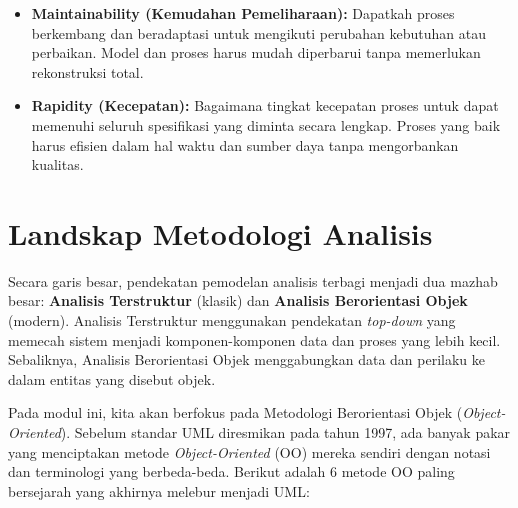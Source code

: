 \documentclass[12pt,a4paper]{article}
\begin{document}
\begin{itemize}
    \item \textbf{Maintainability (Kemudahan Pemeliharaan):} Dapatkah proses berkembang dan beradaptasi untuk mengikuti perubahan kebutuhan atau perbaikan. Model dan proses harus mudah diperbarui tanpa memerlukan rekonstruksi total.
    
    \item \textbf{Rapidity (Kecepatan):} Bagaimana tingkat kecepatan proses untuk dapat memenuhi seluruh spesifikasi yang diminta secara lengkap. Proses yang baik harus efisien dalam hal waktu dan sumber daya tanpa mengorbankan kualitas.
\end{itemize}

\newpage
\section{Landskap Metodologi Analisis}

Secara garis besar, pendekatan pemodelan analisis terbagi menjadi dua mazhab besar: \textbf{Analisis Terstruktur} (klasik) dan \textbf{Analisis Berorientasi Objek} (modern). Analisis Terstruktur menggunakan pendekatan \textit{top-down} yang memecah sistem menjadi komponen-komponen data dan proses yang lebih kecil. Sebaliknya, Analisis Berorientasi Objek menggabungkan data dan perilaku ke dalam entitas yang disebut objek.

Pada modul ini, kita akan berfokus pada Metodologi Berorientasi Objek (\textit{Object-Oriented}). Sebelum standar UML diresmikan pada tahun 1997, ada banyak pakar yang menciptakan metode \textit{Object-Oriented} (OO) mereka sendiri dengan notasi dan terminologi yang berbeda-beda. Berikut adalah 6 metode OO paling bersejarah yang akhirnya melebur menjadi UML:
\end{document}
